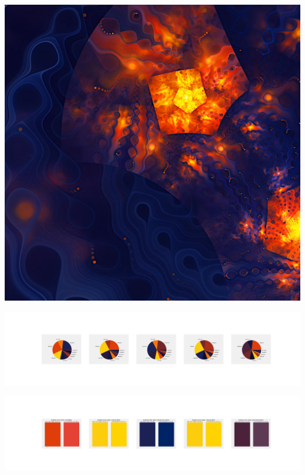 \documentclass[11pt]{article}
\begin{document}
\begin{landscape}
    \begin{center}
    \includegraphics[width=\textwidth]{./nbimg/file (444).jpg}
    \end{center}

    \begin{center}
    \includegraphics[width=250mm]{./nbimg/pie-383.jpg}
    \end{center}

    \begin{center}
    \includegraphics[width=250mm]{./nbimg/peak-383.jpg}
    \end{center}
    


\end{landscape}
\end{document}
